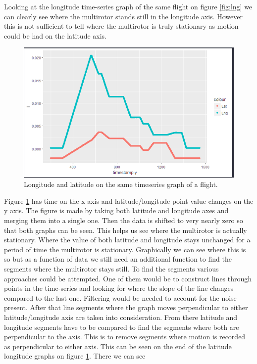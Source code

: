 \documentclass[12pt,oneside]{reedthesis}
\theoremstyle{definition}
\theoremstyle{definition}
\theoremstyle{definition}
\theoremstyle{remark}
\begin{document}
Looking at the longitude time-series graph of the same flight on figure
\ref{fig:lng} we can clearly see where the multirotor stands still in
the longitude axis. However this is not sufficient to tell where the
multirotor is truly stationary as motion could be had on the latitude
axis.
\begin{figure}
\centering
\includegraphics{./figure/latlngSamegraph.PNG}
\caption{\label{fig:lnglat}Longitude and latitude on the same timeseries
graph of a flight.}
\end{figure}
Figure \ref{fig:lnglat} has time on the x axis and latitude/longitude
point value changes on the y axis. The figure is made by taking both
latitude and longitude axes and merging them into a single one. Then the
data is shifted to very nearly zero so that both graphs can be seen.
This helps us see where the multirotor is actually stationary. Where the
value of both latitude and longitude stays unchanged for a period of
time the multirotor is stationary. Graphically we can see where this is
so but as a function of data we still need an additional function to
find the segments where the multirotor stays still. To find the segments
various approaches could be attempted. One of them would be to construct
lines through points in the time-series and looking for where the slope
of the line changes compared to the last one. Filtering would be needed
to account for the noise present. After that line segments where the
graph moves perpendicular to either latitude/longitude axis are taken
into consideration. From there latitude and longitude segments have to
be compared to find the segments where both are perpendicular to the
axis. This is to remove segments where motion is recorded as
perpendicular to either axis. This can be seen on the end of the
latitude longitude graphs on figure \ref{fig:lnglat}. There we can see
\end{document}
